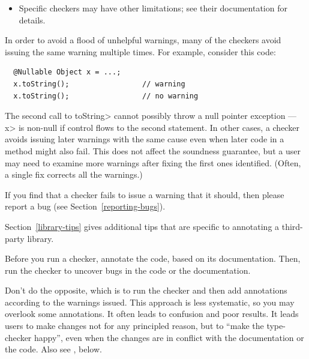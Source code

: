\begin{itemize}
\item
  Specific checkers may have other limitations; see their documentation for
  details.

\end{itemize}

In order to avoid a flood of unhelpful warnings, many of the checkers avoid
issuing the same warning multiple times.  For example, consider this code:

\begin{Verbatim}
  @Nullable Object x = ...;
  x.toString();                 // warning
  x.toString();                 // no warning
\end{Verbatim}

\noindent
The second call to \<toString> cannot possibly throw a null
pointer exception --- \<x> is non-null if control flows to the second
statement.
In other cases, a checker avoids issuing later warnings with the same cause
even when later code in a method might also fail.
This does not
affect the soundness guarantee, but a user may need to examine more
warnings after fixing the first ones identified.  (Often,
a single fix corrects all the warnings.)


If you find that a checker fails to issue a warning that it
should, then please report a bug (see Section~\ref{reporting-bugs}).



Section~\ref{library-tips} gives additional tips that are
specific to annotating a third-party library.



Before you run a checker, annotate the code, based on its documentation.
Then, run the checker to uncover bugs in the code or the documentation.

Don't do the opposite, which is to run the checker and then add annotations
according to the warnings issued.  This approach is less systematic, so you
may overlook some annotations.  It often leads to confusion and poor
results.  It leads users to make changes not for any principled reason, but
to ``make the type-checker happy'', even when the changes are in conflict
with the documentation or the code.  Also see
, below.


